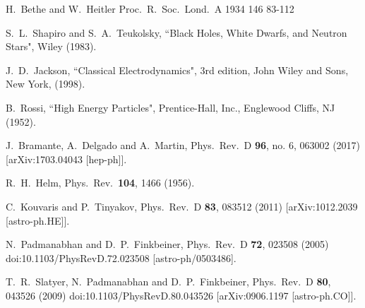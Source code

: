   H.~Bethe and W.~Heitler
  Proc.\ R.\ Soc.\ Lond.\ A 1934 146 83-112

S.~L.~Shapiro and S.~A.~Teukolsky, ``Black Holes, White Dwarfs, and Neutron Stars", Wiley (1983).

J.~D.~Jackson, ``Classical Electrodynamics", 3rd edition, John Wiley and Sons, New
York, (1998).

B.~Rossi, ``High Energy Particles", Prentice-Hall, Inc., Englewood Cliffs, NJ (1952).

  J.~Bramante, A.~Delgado and A.~Martin,
  Phys.\ Rev.\ D {\bf 96}, no. 6, 063002 (2017)
  [arXiv:1703.04043 [hep-ph]].


  R.~H.~Helm,
  Phys.\ Rev.\  {\bf 104}, 1466 (1956).


  C.~Kouvaris and P.~Tinyakov,
  Phys.\ Rev.\ D {\bf 83}, 083512 (2011)
  [arXiv:1012.2039 [astro-ph.HE]].
  
  N.~Padmanabhan and D.~P.~Finkbeiner,
  Phys.\ Rev.\ D {\bf 72}, 023508 (2005)
  doi:10.1103/PhysRevD.72.023508
  [astro-ph/0503486].

  T.~R.~Slatyer, N.~Padmanabhan and D.~P.~Finkbeiner,
  Phys.\ Rev.\ D {\bf 80}, 043526 (2009)
  doi:10.1103/PhysRevD.80.043526
  [arXiv:0906.1197 [astro-ph.CO]].

